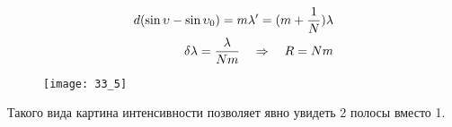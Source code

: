 \begin{align*}
	d(\sin{\upsilon}-\sin{\upsilon_0})=m\lambda'=(m+\frac{1}{N})\lambda\\
	\delta\lambda=\frac{\lambda}{Nm} \quad \Rightarrow \quad R=Nm
\end{align*}

\begin{figure}[H]
	\centering
	\texttt{[image: 33\_5]}
\end{figure} 

Такого вида картина интенсивности позволяет явно увидеть 2 полосы вместо 1.

